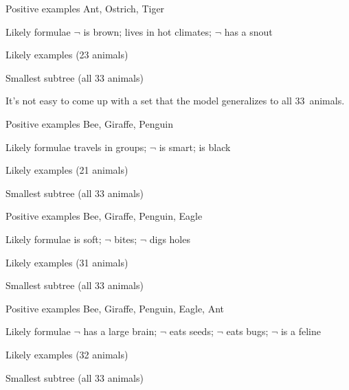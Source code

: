 \documentclass[apacite,jou]{apa6}
\newenvironment{rdescription}%
		{\begin{description}\raggedright}{\end{description}}
\begin{document}
\begin{rdescription}
\item[Positive examples] Ant, Ostrich, Tiger
\item[Likely formulae] $\neg$ is brown; lives in hot climates;
	$\neg$ has a snout
\item[Likely examples]
	(23 animals)
\item[Smallest subtree]  (all 33 animals)
\end{rdescription}

It's not easy to come up with a set that the model
generalizes to all 33~animals. 

\begin{rdescription}
\item[Positive examples] Bee, Giraffe, Penguin
\item[Likely formulae] travels in groups; $\neg$ is smart; is black
\item[Likely examples] (21 animals)
\item[Smallest subtree] (all 33 animals)
\end{rdescription}

\begin{rdescription}
\item[Positive examples] Bee, Giraffe, Penguin, Eagle
\item[Likely formulae] is soft; $\neg$ bites; $\neg$ digs holes
\item[Likely examples] (31 animals)
\item[Smallest subtree] (all 33 animals)
\end{rdescription}

\begin{rdescription}
\item[Positive examples] Bee, Giraffe, Penguin, Eagle, Ant
\item[Likely formulae] $\neg$ has a large brain; $\neg$ eats seeds;
	$\neg$ eats bugs; $\neg$ is a feline 
\item[Likely examples] (32 animals)
\item[Smallest subtree] (all 33 animals)
\end{rdescription}
\end{document}
